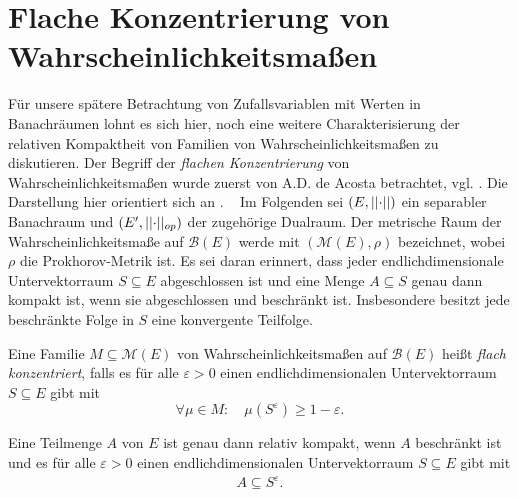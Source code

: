 \section{Flache Konzentrierung von Wahrscheinlichkeitsmaßen}
Für unsere spätere Betrachtung von Zufallsvariablen mit Werten in Banachräumen lohnt es sich hier, noch eine weitere Charakterisierung der relativen Kompaktheit von Familien von Wahrscheinlichkeitsmaßen zu diskutieren. 
Der Begriff der \textit{flachen Konzentrierung} von Wahrscheinlichkeitsmaßen wurde zuerst von A.D. de Acosta betrachtet, vgl. \cite{acosta}. 
Die Darstellung hier orientiert sich an \cite{vakhania}. 
\newline \ \newline 
Im Folgenden sei $(E, \lvert\lvert \cdot \rvert\rvert)$ ein separabler Banachraum und $(E', \lvert\lvert \cdot \rvert\rvert_{op})$ der zugehörige Dualraum. Der metrische Raum der Wahrscheinlichkeitsmaße auf $\mathcal{B}(E)$ werde mit $(\mathcal{M}(E), \rho)$ bezeichnet, wobei 
$\rho$ die Prokhorov-Metrik ist. 
Es sei daran erinnert, dass jeder endlichdimensionale Untervektorraum  $S \subseteq E$ abgeschlossen ist und eine Menge $A \subseteq S$ genau dann kompakt ist, wenn sie abgeschlossen und beschränkt ist. 
Insbesondere besitzt jede beschränkte Folge in $S$ eine konvergente Teilfolge. 
\begin{mydef}
    Eine Familie $M \subseteq \mathcal{M}(E)$ von Wahrscheinlichkeitsmaßen auf $\mathcal{B}(E)$ heißt \textit{flach konzentriert}, falls es für alle $\varepsilon > 0$ einen endlichdimensionalen 
    Untervektorraum $S \subseteq E$ gibt mit 
    $$
        \forall \mu \in M: \quad \mu(S^{\varepsilon}) \geq 1 - \varepsilon.
    $$ 
\end{mydef}

\begin{lemma}
    Eine Teilmenge $A$ von $E$ ist genau dann relativ kompakt, wenn $A$ beschränkt ist und es für alle $\varepsilon > 0$ einen endlichdimensionalen Untervektorraum $S \subseteq E$ gibt mit 
    \begin{align*}
        A \subseteq S^{\varepsilon}. 
    \end{align*}
\end{lemma}

